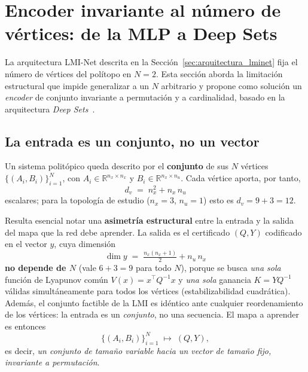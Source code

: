 %      
%
\usetikzlibrary{positioning,arrows.meta,fit,backgrounds,calc}

\section{Encoder invariante al número de vértices: de la MLP a Deep Sets}
\label{sec:deepsets}

La arquitectura LMI-Net descrita en la Sección~\ref{sec:arquitectura_lminet} fija el número
de vértices del polítopo en $N=2$. Esta sección aborda la limitación estructural que impide
generalizar a un $N$ arbitrario y propone como solución un \textit{encoder} de conjunto
invariante a permutación y a cardinalidad, basado en la arquitectura \textit{Deep
Sets}~\cite{zaheer2017deep}.

\subsection{La entrada es un conjunto, no un vector}
\label{subsec:entrada_conjunto}

Un sistema politópico queda descrito por el \textbf{conjunto} de sus $N$ vértices
$\{(A_i, B_i)\}_{i=1}^{N}$, con $A_i \in \mathbb{R}^{n_x \times n_x}$ y
$B_i \in \mathbb{R}^{n_x \times n_u}$. Cada vértice aporta, por tanto,
\begin{equation}
    d_v \;=\; n_x^2 + n_x\,n_u
\end{equation}
escalares; para la topología de estudio ($n_x=3$, $n_u=1$) esto es $d_v = 9 + 3 = 12$.

Resulta esencial notar una \textbf{asimetría estructural} entre la entrada y la salida del
mapa que la red debe aprender. La salida es el certificado $(Q, Y)$ codificado en el vector
$y$, cuya dimensión
\begin{equation}
    \dim y \;=\; \tfrac{n_x(n_x+1)}{2} + n_u\,n_x
    \label{eq:dim_y}
\end{equation}
\textbf{no depende de $N$} (vale $6+3=9$ para todo $N$), porque se busca \emph{una sola}
función de Lyapunov común $V(x)=x^\top Q^{-1} x$ y \emph{una sola} ganancia $K = Y Q^{-1}$
válidas simultáneamente para todos los vértices (estabilizabilidad cuadrática). Además, el
conjunto factible de la LMI es idéntico ante cualquier reordenamiento de los vértices: la
entrada es un \emph{conjunto}, no una secuencia. El mapa a aprender es entonces
\begin{equation}
    \{(A_i,B_i)\}_{i=1}^{N} \;\longmapsto\; (Q, Y),
\end{equation}
es decir, \emph{un conjunto de tamaño variable hacia un vector de tamaño fijo, invariante a
permutación}.

